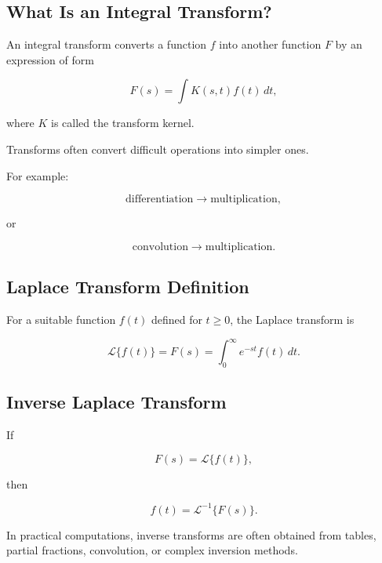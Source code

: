 \subsection{What Is an Integral Transform?}
\label{subsec:integral-transform-reference}

An integral transform converts a function \(f\) into another function
\(F\) by an expression of form

\[
\boxed{
F(s)
=
\int
K(s,t)f(t)\,dt,
}
\]

where \(K\) is called the transform kernel.

Transforms often convert difficult operations into simpler ones.

For example:

\[
\boxed{
\text{differentiation}
\longrightarrow
\text{multiplication},
}
\]

or

\[
\boxed{
\text{convolution}
\longrightarrow
\text{multiplication}.
}
\]

\subsection{Laplace Transform Definition}
\label{subsec:laplace-transform-definition-reference}

For a suitable function \(f(t)\) defined for \(t\geq0\), the Laplace transform
is

\[
\boxed{
\mathcal{L}\{f(t)\}
=
F(s)
=
\int_0^\infty
e^{-st}f(t)\,dt.
}
\]

\subsection{Inverse Laplace Transform}
\label{subsec:inverse-laplace-reference}

If

\[
F(s)
=
\mathcal{L}\{f(t)\},
\]

then

\[
\boxed{
f(t)
=
\mathcal{L}^{-1}\{F(s)\}.
}
\]

In practical computations, inverse transforms are often obtained from tables,
partial fractions, convolution, or complex inversion methods.

